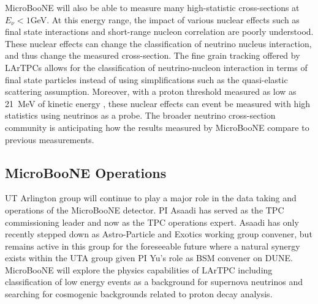 MicroBooNE will also be able to measure many high-statistic cross-sections at $E_{\nu} < 1$GeV. At this energy range, the impact of various nuclear effects such as final state interactions and short-range nucleon correlation are poorly understood. These nuclear effects can change the classification of neutrino nucleus interaction, and thus change the measured cross-section. The fine grain tracking offered by LArTPCs allows for the classification of neutrino-nucleon interaction in terms of final state particles instead of using simplifications such as the quasi-elastic scattering assumption. Moreover, with a proton threshold measured as low as 21~MeV of kinetic energy \cite{Argoneut}, these nuclear effects can event be measured with high statistics using neutrinos as a probe. The broader neutrino cross-section community is anticipating how the results measured by MicroBooNE compare to previous measurements.


\subsection{MicroBooNE Operations}\label{sec:UbooneOperations}
UT Arlington group will continue to play a major role in the data taking and operations of the MicroBooNE detector. PI Asaadi has served as the TPC commissioning leader and now as the TPC operations expert. Asaadi has only recently stepped down as Astro-Particle and Exotics working group convener, but remains active in this group for the foreseeable future where a natural synergy exists within the UTA group given PI Yu's role as BSM convener on DUNE. MicroBooNE will explore the physics capabilities of LArTPC including classification of low energy events as a background for supernova neutrinos and searching for cosmogenic backgrounds related to proton decay analysis.


